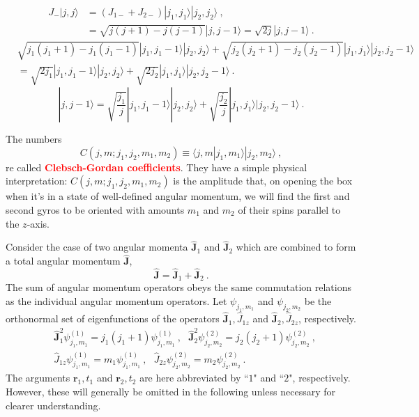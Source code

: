 \documentclass[12pt,a4paper]{article}
\renewcommand{\vec}[1]{\boldsymbol{#1}}
\begin{document}
\begin{align}
J_-  |j, j \rangle &= (J_{1-} +J_{2-} )  |j_1, j_1 \rangle |j_2, j_2 \rangle ~, \\
&= \sqrt{j(j+1) -j(j-1)} |j, j-1 \rangle = \sqrt{2 j} |j, j-1 \rangle ~.
\end{align}
\begin{align}
\nonumber &\sqrt{j_1(j_1+1) -j_1(j_1-1)} |j_1, j_1-1 \rangle |j_2, j_2 \rangle +\sqrt{j_2(j_2+1) -j_2(j_2-1)} |j_1, j_1 \rangle |j_2, j_2 -1 \rangle \\
&= \sqrt{2j_1} |j_1, j_1-1 \rangle |j_2, j_2 \rangle +\sqrt{2j_2} |j_1, j_1 \rangle |j_2, j_2 -1 \rangle  ~.
\end{align}
\begin{equation}
|j, j-1 \rangle = \sqrt{\dfrac{j_1}{j} } |j_1, j_1-1 \rangle |j_2, j_2 \rangle  + \sqrt{\dfrac{j_2}{j} }  |j_1, j_1 \rangle |j_2, j_2 -1 \rangle ~.
\end{equation}


The numbers
\begin{equation}
C(j,m; j_1, j_2, m_1, m_2) \equiv \langle j,m| j_1, m_1\rangle | j_2, m_2\rangle ~,
\end{equation}
re called \textcolor{red}{\bf Clebsch-Gordan coefficients}. They have a simple physical interpretation: $C(j, m; j_1, j_2, m_1, m_2)$ is the amplitude that, on opening the box when it's in a state of well-defined angular momentum, we will find the first and second gyros to be oriented with amounts $m_1$ and $m_2$ of their spins parallel to the $z$-axis. 



\cite{greiner1994quantum} Consider the case of two angular momenta $\vec{\hat{J}}_1$ and $\vec{\hat{J}}_2$ which are combined to form a total angular momentum $\vec{\hat{J}}$,
\begin{equation*}
\vec{\hat{J}} = \vec{\hat{J}}_1 +\vec{\hat{J}}_2 ~.
\end{equation*}
The sum of angular momentum operators obeys the same commutation relations as the individual angular momentum operators. Let $\psi_{j_1,m_1}$ and $\psi_{j_2,m_2}$ be the orthonormal set of eigenfunctions of the operators $\vec{\hat{J}}_1,  \hat{J}_{1z}$ and $\vec{\hat{J}}_2,  \hat{J}_{2z}$, respectively. 
\begin{align*}
& \vec{\hat{J}}_1^2 \psi_{j_1,m_1}^{(1)} = j_1 (j_1+1) \psi_{j_1,m_1}^{(1)} ~,  ~~~ \vec{\hat{J}}_2^2 \psi_{j_2,m_2}^{(2)} = j_2 (j_2+1) \psi_{j_2,m_2}^{(2)} ~, \\
& \hat{J}_{1z} \psi_{j_1,m_1}^{(1)} = m_1 \psi_{j_1,m_1}^{(1)} ~, ~~~ \hat{J}_{2z} \psi_{j_2,m_2}^{(2)} = m_2 \psi_{j_2,m_2}^{(2)} ~.
\end{align*}
The arguments $\vec{r}_1, t_1$ and $\vec{r}_2, t_2$ are here abbreviated by ``$1$" and ``$2$", respectively. However, these will generally be omitted in the following unless necessary for clearer understanding.
\end{document}
